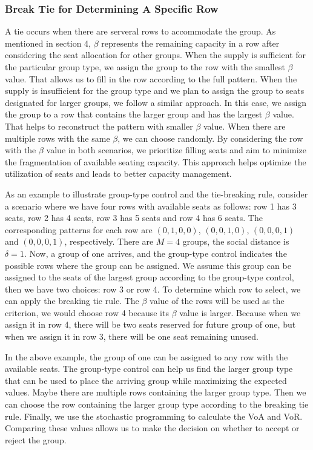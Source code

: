 \subsubsection*{Break Tie for Determining A Specific Row}
A tie occurs when there are serveral rows to accommodate the group. As mentioned in section 4, $\beta$ represents the remaining capacity in a row after considering the seat allocation for other groups.
When the supply is sufficient for the particular group type, we assign the group to the row with the smallest $\beta$ value. That allows us to fill in the row according to the full pattern. When the supply is insufficient for the group type and we plan to assign the group to seats designated for larger groups, we follow a similar approach. In this case, we assign the group to a row that contains the larger group and has the largest $\beta$ value. That helps to reconstruct the pattern with smaller $\beta$ value. When there are multiple rows with the same $\beta$, we can choose randomly. By considering the row with the $\beta$ value in both scenarios, we prioritize filling seats and aim to minimize the fragmentation of available seating capacity. This approach helps optimize the utilization of seats and leads to better capacity management.

As an example to illustrate group-type control and the tie-breaking rule, consider a scenario where we have four rows with available seats as follows: row 1 has 3 seats, row 2 has 4 seats, row 3 has 5 seats and row 4 has 6 seats. The corresponding patterns for each row are $(0,1,0,0)$, $(0,0,1,0)$, $(0,0,0,1)$ and $(0,0,0,1)$, respectively. There are $M =4$ groups, the social distance is $\delta =1$. Now, a group of one arrives,  and the group-type control indicates the possible rows where the group can be assigned. We assume this group can be assigned to the seats of the largest group according to the group-type control, then we have two choices: row 3 or row 4. To determine which row to select, we can apply the breaking tie rule. The $\beta$ value of the rows will be used as the criterion, we would choose row 4 because its $\beta$ value is larger. Because when we assign it in row 4, there will be two seats reserved for future group of one, but when we assign it in row 3, there will be one seat remaining unused.

In the above example, the group of one can be assigned to any row with the available seats. The group-type control can help us find the larger group type that can be used to place the arriving group while maximizing the expected values. Maybe there are multiple rows containing the larger group type. Then we can choose the row containing the larger group type according to the breaking tie rule. 
Finally, we use the stochastic programming to calculate the VoA and VoR. Comparing these values allows us to make the decision on whether to accept or reject the group.

